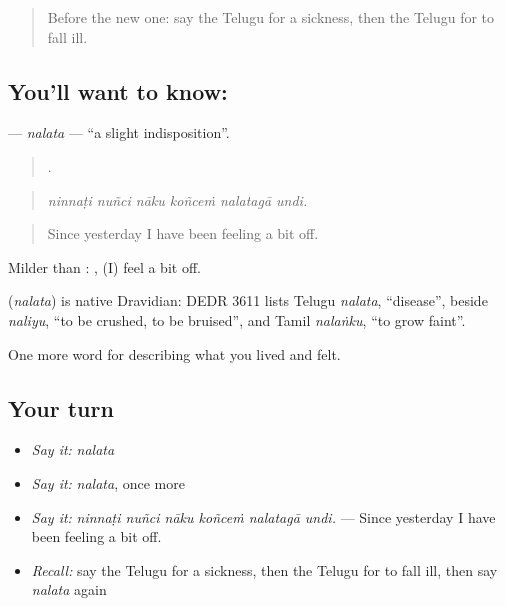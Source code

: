 \label{lesson:TE-C512-nalata}



\begin{quote}
Before the new one: say the Telugu for a sickness, then the Telugu for to fall ill.
\end{quote}

\subsection*{You'll want to know: }
\textbf{} — \emph{nalata} — \textquotedblleft{}a slight indisposition\textquotedblright{}.

\begin{quote}
     .
\end{quote}

\begin{quote}
\emph{ninnaṭi nuñci nāku koñceṁ nalatagā undi.}
\end{quote}

\begin{quote}
Since yesterday I have been feeling a bit off.
\end{quote}

Milder than :  , (I) feel a bit off.

\begin{cousinweb}
\textbf{} (\emph{nalata}) is native Dravidian: DEDR 3611 lists Telugu \emph{nalata}, \textquotedblleft{}disease\textquotedblright{}, beside \emph{naliyu}, \textquotedblleft{}to be crushed, to be bruised\textquotedblright{}, and Tamil \emph{nalaṅku}, \textquotedblleft{}to grow faint\textquotedblright{}.
\end{cousinweb}

\begin{grammarlens}[title={What you've built}]
One more word for describing what you lived and felt.
\end{grammarlens}

\subsection*{Your turn}
\begin{itemize}
\raggedright
  \item \emph{Say it:} \emph{nalata}
  \item \emph{Say it:} \emph{nalata}, once more
  \item \emph{Say it:} \emph{ninnaṭi nuñci nāku koñceṁ nalatagā undi.} — Since yesterday I have been feeling a bit off.
  \item \emph{Recall:} say the Telugu for a sickness, then the Telugu for to fall ill, then say \emph{nalata} again
\end{itemize}

